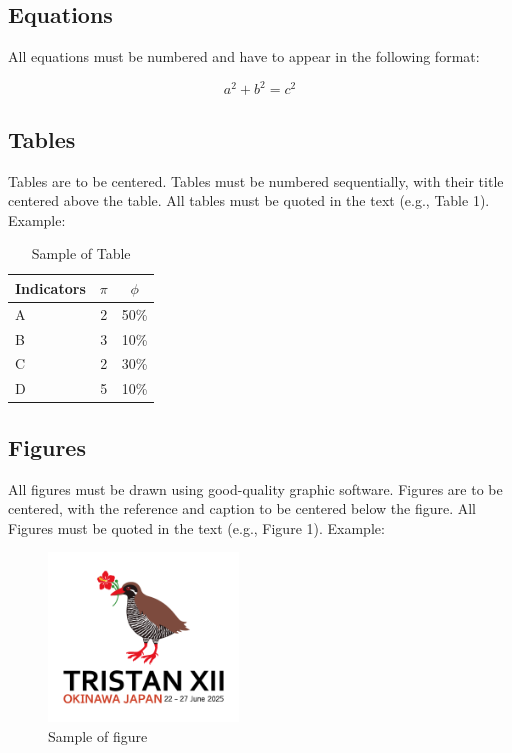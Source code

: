\documentclass[a4paper,twoside,11pt]{article}
\begin{document}
\subsection{Equations}

All equations must be numbered and have to appear in the following format:

\begin{equation}
    a^2 + b^2 = c^2  \label{eq:1}  
\end{equation}

\subsection{Tables}
Tables are to be centered. Tables must be numbered sequentially, with their title centered above the table. All tables must be quoted in the text (e.g., Table 1). Example:

\begin{table}[H]
\centering
\caption{Sample of Table}
\begin{tabular}{lcc} \hline 
Indicators & $\pi$ & $\phi$ \\ \hline 
A & 2 & 50\% \\  
B & 3 & 10\% \\ 
C & 2 & 30\% \\  
D & 5 & 10\% \\ \hline 
\end{tabular}
\end{table}

\subsection{Figures}
All figures must be drawn using good-quality graphic software. Figures are to be centered, with the reference and caption to be centered below the figure. All Figures must be quoted in the text (e.g., Figure 1). Example:

\begin{figure}[H]
	\center
	\includegraphics[width=0.45\textwidth]{TristanXII.png}
	\caption{Sample of figure}
\end{figure}
\end{document}
